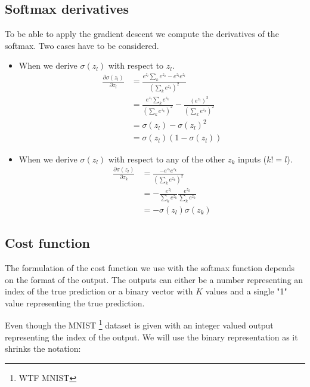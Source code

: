 	\subsection{Softmax derivatives}
		To be able to apply the gradient descent we compute the derivatives of the softmax. Two cases have to be considered. 
		\begin{itemize}
			\item When we derive $\sigma(z_l)$ with respect to $z_l$.
			\begin{equation} \label{eq:grad_sima_zk1}
				\begin{split}
					\frac{\partial \sigma(z_l)}{\partial z_l} 
					&= \frac{ e^{z_l} \sum_{k} e^{z_k} - e^{z_l} e^{z_l}}{ (\sum_{k} e^{z_k})^2 } \\
					&= \frac{ e^{z_l} \sum_{k} e^{z_k} }{ (\sum_{k} e^{z_k})^2 } - \frac{ (e^{z_l})^2 }{ (\sum_{k} e^{z_k})^2 }\\
					&= \sigma(z_l) - \sigma(z_l)^2 \\
					&= \sigma(z_l)(1-\sigma(z_l))
				\end{split}
			\end{equation}

			\item When we derive $\sigma(z_l)$ with respect to any of the other $z_{k}$ inputs ($k != l$).
			\begin{equation} \label{eq:grad_sima_zk}
				\begin{split}
					\frac{\partial \sigma(z_l)}{\partial z_{k}}
					&= \frac{ - e^{z_l} e^{z_{k}}}{ (\sum_{k} e^{z_k})^2 } \\
					&= - \frac{ e^{z_l} }{ \sum_{k} e^{z_k} } \frac{ e^{z_{k}} }{ \sum_{k} e^{z_k} }\\
					&= - \sigma(z_l)\sigma(z_{k})
				\end{split}
			\end{equation}
		\end{itemize}


	\subsection{Cost function}
		The formulation of the cost function we use with the softmax function depends on the format of the output. The outputs can either be a number representing an index of the true prediction or a binary vector with $K$ values and a single "1" value representing the true prediction.

		Even though the MNIST \footnote{WTF MNIST} dataset is given with an integer valued output representing the index of the output. We will use the binary representation as it shrinks the notation:

